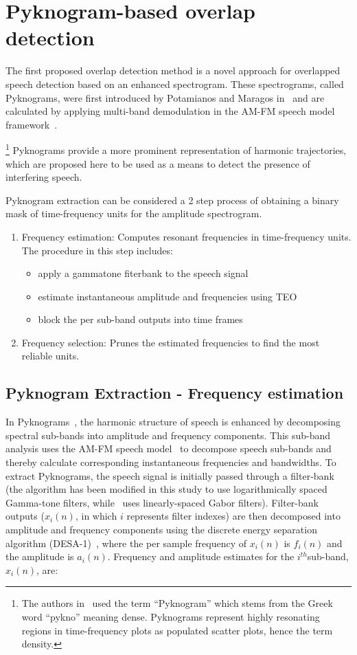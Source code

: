 \section{Pyknogram-based overlap detection}
\label{sec:ch2_Pykno}
The first proposed overlap detection method is a novel approach for overlapped speech detection based on an enhanced spectrogram. 
These spectrograms, called Pyknograms, were first introduced by Potamianos and Maragos in~\cite{potamianos_maragos_icassp95,potamianos_maragos_jasa96} and are calculated by applying multi-band demodulation in the AM-FM speech model framework~\cite{maragos_kaiser_quatieri}.{\footnote{The authors in~\cite{potamianos_maragos_jasa96} used the term ``Pyknogram'' which stems from the Greek word ``pykno'' meaning dense. Pyknograms represent highly resonating regions in time-frequency plots as populated scatter plots, hence the term density.} 
Pyknograms provide a more prominent representation of harmonic trajectories, which are proposed here to be used as a means to detect the presence of interfering speech.

Pyknogram extraction can be considered a 2 step process of obtaining a binary mask of time-frequency units for the amplitude spectrogram. 
\begin{enumerate}
	\item Frequency estimation: Computes resonant frequencies in time-frequency units. The procedure in this step includes: 
	\begin{itemize}
		\item apply a gammatone fiterbank to the speech signal
		\item estimate instantaneous amplitude and frequencies using TEO
		\item block the per sub-band outputs into time frames
	\end{itemize}
	\item Frequency selection: Prunes the estimated frequencies to find the most reliable units.
\end{enumerate}

\subsection{Pyknogram Extraction - Frequency estimation}
\label{ssec:pykno_estimate}
In Pyknograms~\cite{potamianos_maragos_jasa96}, the harmonic structure of speech is enhanced by decomposing spectral sub-bands into amplitude and frequency components. 
This sub-band analysis uses the AM-FM speech model~\cite{maragos_kaiser_quatieri} to decompose speech sub-bands and thereby calculate corresponding instantaneous frequencies and bandwidths. 
To extract Pyknograms, the speech signal is initially passed through a filter-bank (the algorithm has been modified in this study to use logarithmically spaced Gamma-tone filters, while~\cite{potamianos_maragos_jasa96} uses linearly-spaced Gabor filters). 
Filter-bank outputs ($x_i(n)$, in which $i$ represents filter indexes) are then decomposed into amplitude and frequency components using the discrete energy separation algorithm (DESA-1)~\cite{maragos_kaiser_quatieri}, where the per sample frequency of $x_i(n)$ is $f_i(n)$ and the amplitude is $a_i(n)$. Frequency and amplitude estimates for the $i^{th} $sub-band, $x_i(n)$, are:

}

